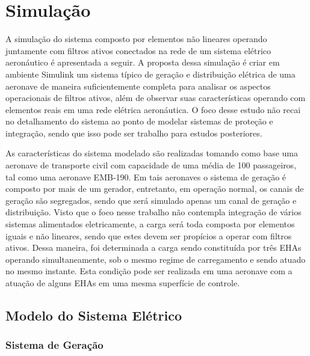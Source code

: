 \section{Simulação}

A simulação do sistema composto por elementos não lineares operando juntamente com filtros ativos conectados na rede de um sistema elétrico aeronáutico é apresentada a seguir. A proposta dessa simulação é criar em ambiente Simulink um sistema típico de geração e distribuição elétrica de uma aeronave de maneira suficientemente completa para analisar os aspectos operacionais de filtros ativos, além de observar suas características operando com elementos reais em uma rede elétrica aeronáutica. O foco desse estudo não recai no detalhamento do sistema ao ponto de modelar sistemas de proteção e integração, sendo que isso pode ser trabalho para estudos posteriores.

As características do sistema modelado são realizadas tomando como base uma aeronave de transporte civil com capacidade de uma média de 100 passageiros, tal como uma aeronave EMB-190. Em tais aeronaves o sistema de geração é composto por mais de um gerador, entretanto, em operação normal, os canais de geração são segregados, sendo que será simulado apenas um canal de geração e distribuição. Visto que o foco nesse trabalho não contempla integração de vários sistemas alimentados eletricamente, a carga será toda composta por elementos iguais e não lineares, sendo que estes devem ser propícios a operar com filtros ativos. Dessa maneira, foi determinada a carga sendo constituída por três EHAs operando simultaneamente, sob o mesmo regime de carregamento e sendo atuado no mesmo instante. Esta condição pode ser realizada em uma aeronave com a atuação de alguns EHAs em uma mesma superfície de controle.

\subsection{Modelo do Sistema Elétrico}

\subsubsection{Sistema de Geração}

